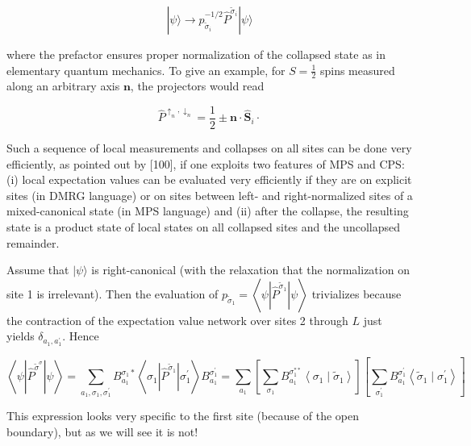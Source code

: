 \documentclass[12pt]{article}
\begin{document}
\begin{equation*}
|\psi\rangle \rightarrow p_{\tilde{\sigma}_{i}}^{-1 / 2} \hat{P}^{\tilde{\sigma}_{i}}|\psi\rangle \tag{305}
\end{equation*}


where the prefactor ensures proper normalization of the collapsed state as in elementary quantum mechanics. To give an example, for $S=\frac{1}{2}$ spins measured along an arbitrary axis $\mathbf{n}$, the projectors would read


\begin{equation*}
\hat{P}^{\uparrow_{n}, \downarrow_{n}}=\frac{1}{2} \pm \mathbf{n} \cdot \hat{\mathbf{S}}_{i} \cdot \tag{306}
\end{equation*}


Such a sequence of local measurements and collapses on all sites can be done very efficiently, as pointed out by [100], if one exploits two features of MPS and CPS: (i) local expectation values can be evaluated very efficiently if they are on explicit sites (in DMRG language) or on sites between left- and right-normalized sites of a mixed-canonical state (in MPS language) and (ii) after the collapse, the resulting state is a product state of local states on all collapsed sites and the uncollapsed remainder.

Assume that $|\psi\rangle$ is right-canonical (with the relaxation that the normalization on site 1 is irrelevant). Then the evaluation of $p_{\tilde{\sigma}_{1}}=\left\langle\psi\left|\hat{P}^{\tilde{\sigma}_{1}}\right| \psi\right\rangle$ trivializes because the contraction of the expectation value network over sites 2 through $L$ just yields $\delta_{a_{1}, a_{1}^{\prime}}$. Hence


\begin{equation*}
\left\langle\psi\left|\hat{P}^{\tilde{\sigma}^{\sigma}}\right| \psi\right\rangle=\sum_{a_{1}, \sigma_{1}, \sigma_{1}^{\prime}} B_{a_{1}}^{\sigma_{1} *}\left\langle\sigma_{1}\left|\hat{P}^{\tilde{\sigma}_{1}}\right| \sigma_{1}^{\prime}\right\rangle B_{a_{1}}^{\sigma_{1}^{\prime}}=\sum_{a_{1}}\left[\sum_{\sigma_{1}} B_{a_{1}}^{\sigma_{1}^{* *}}\left\langle\sigma_{1} \mid \tilde{\sigma}_{1}\right\rangle\right]\left[\sum_{\sigma_{1}^{\prime}} B_{a_{1}}^{\sigma_{1}^{\prime}}\left\langle\tilde{\sigma}_{1} \mid \sigma_{1}^{\prime}\right\rangle\right] \tag{307}
\end{equation*}


This expression looks very specific to the first site (because of the open boundary), but as we will see it is not!
\end{document}
